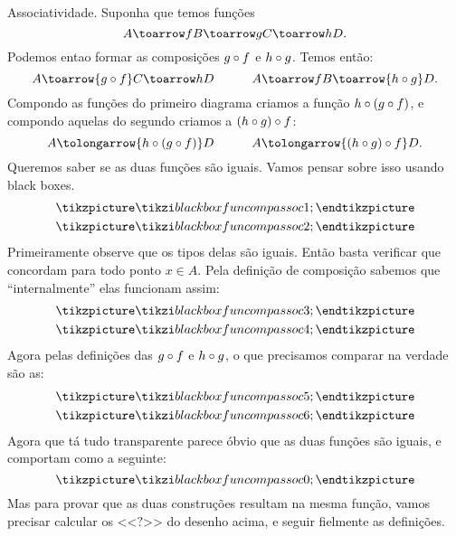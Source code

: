 \note Associatividade.
Suponha que temos funções
$$
A \toarrow f B \toarrow g C \toarrow h D.
$$
Podemos entao formar as composições $g\of f$ e $h\of g$.
Temos então:
$$
A \toarrow {g\of f} C \toarrow h D
\qqquad
A \toarrow f B \toarrow {h\of g} D.
$$
Compondo as funções do primeiro diagrama criamos a função $h\of(g\of f)$,
e compondo aquelas do segundo criamos a $(h\of g)\of f$:
$$
A \tolongarrow {h\of (g\of f)} D
\qqquad
A \tolongarrow {(h\of g)\of f} D.
$$
Queremos saber se as duas funções são iguais.
Vamos pensar sobre isso usando black boxes.
$$
\gathered
\tikzpicture
\tikzi blackboxfuncompassoc1;
\endtikzpicture \\
\tikzpicture
\tikzi blackboxfuncompassoc2;
\endtikzpicture
\endgathered
$$
Primeiramente observe que os tipos delas são iguais.
Então basta verificar que concordam para todo ponto $x\in A$.
Pela definição de composição sabemos que ``internalmente''
elas funcionam assim:
$$
\gathered
\tikzpicture
\tikzi blackboxfuncompassoc3;
\endtikzpicture \\
\tikzpicture
\tikzi blackboxfuncompassoc4;
\endtikzpicture
\endgathered
$$
Agora pelas definições das $g\of f$ e $h\of g$,
o que precisamos comparar na verdade são as:
$$
\gathered
\tikzpicture
\tikzi blackboxfuncompassoc5;
\endtikzpicture \\
\tikzpicture
\tikzi blackboxfuncompassoc6;
\endtikzpicture
\endgathered
$$
Agora que tá tudo transparente parece óbvio que as duas funções são iguais,
e comportam como a seguinte:
$$
\tikzpicture
\tikzi blackboxfuncompassoc0;
\endtikzpicture
$$
Mas para provar que as duas construções resultam na mesma função,
vamos precisar calcular os <<$?$>> do desenho acima, e seguir
fielmente as definições.

